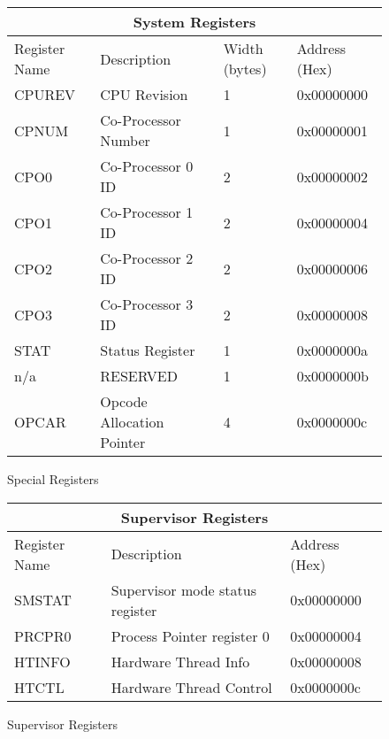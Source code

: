 \documentclass[letterpaper, 11pt]{article}
\begin{document}
\begin{figure}
	
	\caption{Special Registers}
	\begin{center}
		\fontsize{6}{8}\selectfont
		\begin{tabular}{|l|l|l|l|}
			\hline
			\multicolumn{4}{|c|}{System Registers} \\
			\hline
			Register Name & Description & Width (bytes) &Address (Hex) \\ \hline
			CPUREV  & CPU Revision 				 & 	1		& 0x00000000\\ 	\hline
			CPNUM	& Co-Processor Number		 &	1		& 0x00000001\\	\hline
			CPO0  	& Co-Processor 0 ID 		 & 	2		& 0x00000002\\ 	\hline
			CPO1  	& Co-Processor 1 ID 		 &	2		& 0x00000004\\ 	\hline
			CPO2  	& Co-Processor 2 ID 		 &	2		& 0x00000006\\ 	\hline
			CPO3  	& Co-Processor 3 ID 		 &	2		& 0x00000008\\ 	\hline
			STAT	& Status Register			 &	1		& 0x0000000a \\ 	\hline
			n/a		& RESERVED				 	 &	1		& 0x0000000b \\ \hline
			OPCAR	& Opcode Allocation Pointer	 &	4		& 0x0000000c \\ \hline
			
		\end{tabular}
	\end{center}
\end{figure}

\begin{figure}
	\caption{Supervisor Registers}
	
	\begin{center}
		\fontsize{6}{8}\selectfont
		\begin{tabular}{|l|l|l|}
			\hline
			\multicolumn{3}{|c|}{Supervisor Registers} \\
			\hline
			Register Name & Description & Address (Hex)\\ \hline
			SMSTAT & Supervisor mode status register & 0x00000000 \\ 	\hline
			PRCPR0 & Process Pointer register 0 	 & 0x00000004	\\ \hline 
			HTINFO & Hardware Thread Info 			 & 0x00000008 \\ \hline
			HTCTL  & Hardware Thread Control		 & 0x0000000c \\ \hline
		\end{tabular}
	\end{center}
	
\end{figure}
\end{document}
